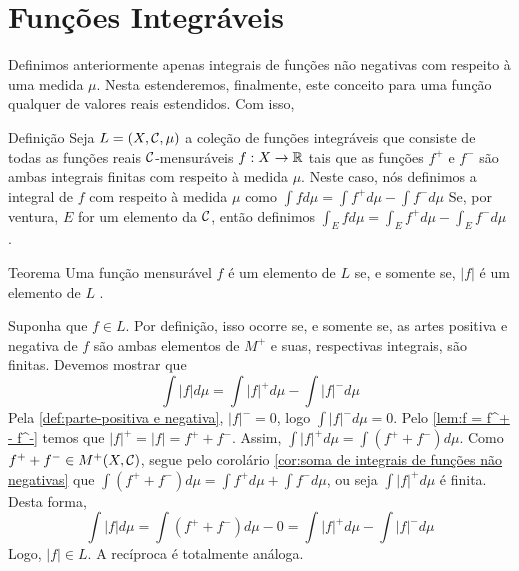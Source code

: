 \section{Funções Integráveis}
Definimos anteriormente apenas integrais de funções não negativas com respeito à uma medida $\mu$.
Nesta estenderemos, finalmente, este conceito para uma função qualquer de valores reais estendidos. Com isso,

\begin{env}{Definição}
	Seja $L = (X, \operatorname{\mathcal{C}}, \mu)$ a coleção de funções integráveis que consiste de todas as funções reais $\operatorname{\mathcal{C}}$-mensuráveis $f:X \to \mathbb{R}$ tais que as funções
	$f^+$ e $f^-$ são ambas integrais finitas com respeito à medida $\mu$.
	Neste caso, nós definimos a integral de $f$ com respeito à medida $\mu$ como
	$
	\int fd\mu
	= \int f^+ d\mu - \int f^- d\mu
	$
	Se, por ventura, $E$ for um elemento da \sigal $\operatorname{\mathcal{C}}$, então definimos
	$
	\int_E fd\mu
	= \int_E f^+ d\mu - \int_E f^- d\mu
	$ \cite{bartle}.
\end{env}

\begin{env}{Teorema}
	\label{teo:f é integrável se, só, se |f| o é}
	Uma função mensurável $f$ é um elemento de $L$ se, e somente se, $|f|$ é um elemento de $L$ \cite{bartle}.
\end{env}
\begin{prova}
	Suponha que $f \in L$.
	Por definição, isso ocorre se, e somente se, as artes positiva e negativa de $f$ são ambas elementos de $M^+$ e suas, respectivas integrais, são finitas.
	Devemos mostrar que 
	$$
		\int |f| d\mu = \int |f|^+ d\mu - \int |f|^-d\mu
	$$
	Pela \ref{def:parte-positiva e negativa}, $|f|^- = 0$, logo 
	$\int |f|^- d\mu = 0$.
	Pelo \ref{lem:f = f^+ - f^-} temos que
	$|f|^+ = |f| = f^+ + f^-$.
	Assim, $\displaystyle \int |f|^+ d\mu = \int (f^+ + f^-)d\mu$.
	Como $f^+ + f^- \in M^+(X, \operatorname{\mathcal{C}})$, segue pelo corolário \ref{cor:soma de integrais de funções não negativas} que 
	$\displaystyle\int (f^+ + f^-)d\mu = \int f^+ d\mu + \int f^- d\mu$, ou seja $\displaystyle\int |f|^+d\mu$ é finita.
	Desta forma, 
	$$
	\int |f| d\mu 
	= \int (f^+ + f^-)d\mu - 0 
	= \int |f|^+ d\mu - \int |f|^- d\mu
	$$
	Logo, $|f| \in L$.
	A recíproca é totalmente análoga.	
\end{prova}

